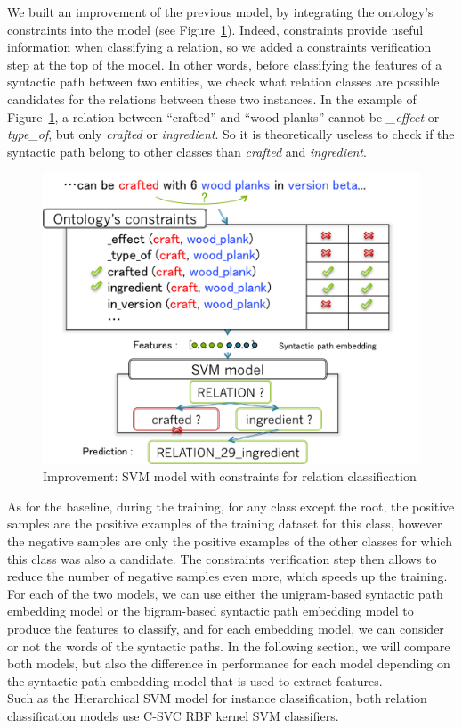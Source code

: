 \documentclass[twocolumn]{article}
\begin{document}
We built an improvement of the previous model, by integrating the ontology's constraints into the model (see Figure~\ref{relationClassificationImprovement}).
Indeed, constraints provide useful information when classifying a relation, so we added a constraints verification step at the top of the model.
In other words, before classifying the features of a syntactic path between two entities, we check what relation classes are possible candidates for the relations between these two instances. In the example of Figure~\ref{relationClassificationImprovement}, a relation between ``crafted'' and ``wood planks'' cannot be \textit{\_effect} or \textit{type\_of}, but only \textit{crafted} or \textit{ingredient}. So it is theoretically useless to check if the syntactic path belong to other classes than \textit{crafted} and \textit{ingredient}.

\begin{figure}[t]
   \centering \includegraphics[width=\linewidth]{Figures/Semantic_Parsing/relationClassificationImprovement.png}
   \caption{\label{relationClassificationImprovement} Improvement: SVM model with constraints for relation classification}
\end{figure}

As for the baseline, during the training, for any class except the root, the positive samples are the positive examples of the training dataset for this class, however the negative samples are only the positive examples of the other classes for which this class was also a candidate. The constraints verification step then allows to reduce the number of negative samples even more, which speeds up the training.\\
For each of the two models, we can use either the unigram-based syntactic path embedding model or the bigram-based syntactic path embedding model to produce the features to classify, and for each embedding model, we can consider or not the words of the syntactic paths. In the following section, we will compare both models, but also the difference in performance for each model depending on the syntactic path embedding model that is used to extract features.\\
Such as the Hierarchical SVM model for instance classification, both relation classification models use C-SVC RBF kernel SVM classifiers.
\end{document}
